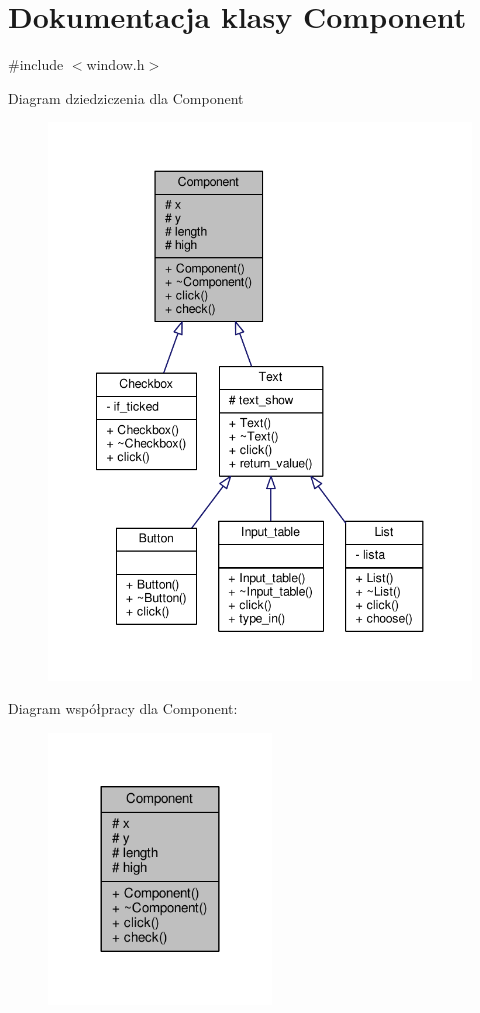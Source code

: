 \hypertarget{classComponent}{}\section{Dokumentacja klasy Component}
\label{classComponent}


{\ttfamily \#include $<$window.\+h$>$}



Diagram dziedziczenia dla Component\nopagebreak
\begin{figure}[H]
\begin{center}
\leavevmode
\includegraphics[width=348pt]{classComponent__inherit__graph}
\end{center}
\end{figure}


Diagram współpracy dla Component\+:\nopagebreak
\begin{figure}[H]
\begin{center}
\leavevmode
\includegraphics[width=168pt]{classComponent__coll__graph}
\end{center}
\end{figure}

